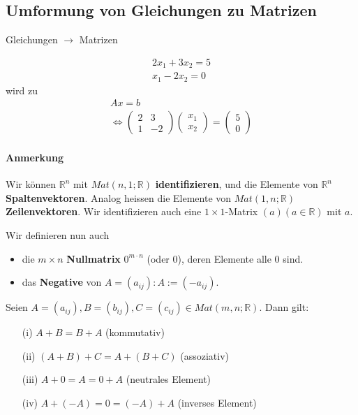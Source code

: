 \documentclass[11pt]{report}
\newcommand*\Zb[1] {\mathbb{#1}}
\newcommand*\f[1] {\textbf{#1}}
\begin{document}
\subsection{Umformung von Gleichungen zu Matrizen}
Gleichungen $\rightarrow$ Matrizen

\begin{align}
2x_1 + 3x_2 = 5 \\
x_1 - 2x_2 = 0
\end{align}
wird zu
\begin{align}
Ax = b  \\
\Leftrightarrow \begin{pmatrix} 2 & 3 \\ 1 & -2 \end{pmatrix} \begin{pmatrix} x_1 \\ x_2 \end{pmatrix} = \begin{pmatrix} 5 \\ 0 \end{pmatrix}
\end{align}

\paragraph{Anmerkung} Wir können $\Zb{R}^n$ mit $Mat(n, 1; \Zb{R})$ \f{identifizieren}, und die Elemente von $\Zb{R}^n$ \f{Spaltenvektoren}. Analog heissen die Elemente von $Mat(1,n; \Zb{R})$ \f{Zeilenvektoren}. Wir identifizieren auch eine $1\times 1$-Matrix $(a)(a \in \Zb{R})$ mit $a$.

Wir definieren nun auch
\begin{itemize}
 \item die $m\times n$ \f{Nullmatrix} $0^{m\cdot n}$ (oder 0), deren Elemente alle $0$ sind.
 \item das \f{Negative} von $A=(a_{ij}): A := (-a_{ij})$.
\end{itemize}

\begin{lemma}
\label{lemma121}
Seien $A=(a_{ij}), B=(b_{ij}), C=(c_{ij}) \in Mat(m, n; \Zb{R})$.
Dann gilt:
\begin{itemize}
 \item[(i)] $A + B = B + A$ (kommutativ)
 \item[(ii)] $(A + B) + C = A + (B + C)$ (assoziativ)
 \item[(iii)] $A + 0 = A = 0 + A$ (neutrales Element)
 \item[(iv)] $A + (-A) = 0 = (-A) + A$ (inverses Element)
\end{itemize}
\end{lemma} 
\end{document}
